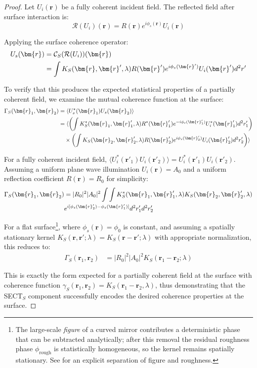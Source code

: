 \documentclass[a4paper,12pt]{article}
\begin{document}
\begin{proof}
Let $U_i(\bm{r})$ be a fully coherent incident field. The reflected field after surface interaction is:
\begin{equation}
\mathcal{R}(U_i)(\bm{r}) = R(\bm{r}) e^{i\phi_s(\bm{r})} U_i(\bm{r})
\end{equation}

Applying the surface coherence operator:
\begin{align}
U_s(\bm{r}) &= \mathcal{C}_S(\mathcal{R}(U_i))(\bm{r}) \\
&= \int K_S(\bm{r}, \bm{r}', \lambda) R(\bm{r}') e^{i\phi_s(\bm{r}')} U_i(\bm{r}') d^2r' \notag
\end{align}

To verify that this produces the expected statistical properties of a partially coherent field, we examine the mutual coherence function at the surface:
\begin{align}
\Gamma_S(\bm{r}_1, \bm{r}_2) &= \langle U_s^*(\bm{r}_1) U_s(\bm{r}_2) \rangle \\
&= \langle \left(\int K_S^*(\bm{r}_1, \bm{r}'_1, \lambda) R^*(\bm{r}'_1) e^{-i\phi_s(\bm{r}'_1)} U_i^*(\bm{r}'_1) d^2r'_1\right) \notag \\ 
& \quad \times \left(\int K_S(\bm{r}_2, \bm{r}'_2, \lambda) R(\bm{r}'_2) e^{i\phi_s(\bm{r}'_2)} U_i(\bm{r}'_2) d^2r'_2\right) \rangle \notag
\end{align}

For a fully coherent incident field, $\langle U_i^*(\bm{r}'_1) U_i(\bm{r}'_2) \rangle = U_i^*(\bm{r}'_1) U_i(\bm{r}'_2)$. 
Assuming a uniform plane wave illumination $U_i(\bm{r}) = A_0$ and a uniform reflection 
coefficient $R(\bm{r}) = R_0$ for simplicity:
\begin{align}
\Gamma_S(\bm{r}_1, \bm{r}_2) &= |R_0|^2 |A_0|^2 \int\int K_S^*(\bm{r}_1, \bm{r}'_1, \lambda) K_S(\bm{r}_2, \bm{r}'_2, \lambda) \\
&e^{i[\phi_s(\bm{r}'_2) - \phi_s(\bm{r}'_1)]} d^2r'_1 d^2r'_2 \notag
\end{align}

For a flat surface\footnote{The large-scale \emph{figure} of a curved mirror contributes a deterministic
phase that can be subtracted analytically; after this removal the residual
roughness phase $\phi_{\text{rough}}$ is statistically homogeneous, so the
kernel remains spatially stationary.  See \cite{moriya2025rdf} for an explicit
separation of figure and roughness.}, where $\phi_s(\bm r)=\phi_0$ is constant,
and assuming a spatially stationary kernel
$K_S(\bm r,\bm r';\lambda)=K_S(\bm r-\bm r';\lambda)$ with appropriate
normalization, this reduces to:
\begin{align}
\Gamma_S(\bm r_1,\bm r_2)
  &= |R_0|^2 |A_0|^2 K_S(\bm r_1-\bm r_2;\lambda)
  \label{eq:GammaSFlat}
\end{align}

This is exactly the form expected for a partially coherent field at the surface with coherence 
function $\gamma_S(\bm{r}_1, \bm{r}_2) = K_S(\bm{r}_1 - \bm{r}_2, \lambda)$, thus demonstrating that the SECT$_S$ 
component successfully encodes the desired coherence properties at the surface.
\end{proof}
\end{document}
